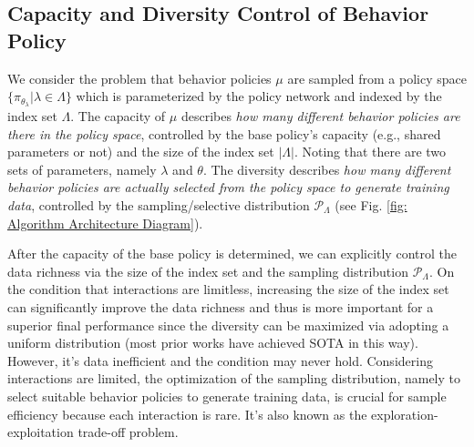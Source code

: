 \documentclass[nohyperref]{article}
\theoremstyle{plain}
\begin{document}
\iffalse
1. 当数据量无限的时候，我们甚至不需要去特意的优化这个选择分布，我们哪怕选择一个random采样（只要保证覆盖全空间就好了），这个时候多样性和复杂性就等价了。因为采样策略族的多样性代表了一群采样策略的差异度。复杂性代表采样策略的复杂度。当数据量无限的时候，我只需要将能够获取到的全部的可行策略构成一个策略族，然后进行采样就可以达到最大的多样性。

2. 但是当我们的数据有限的时候，我们需要专门去优化这个采样分布，因为我们需要从参数化的策略空间中选择那些优质的采样策略来构成一个策略族，此时采样策略的多样性就会受到选择分布的影响。

上面这个逻辑是文章的核心逻辑，最终将整体问题cast成策略空间的

shared or not shared 一般用啥词呀？
\fi


\subsection{Capacity and Diversity  Control of Behavior Policy} 
\label{sec: Explicit  Capacity and Diversity  Control of Behavior Policy}

We consider the problem that behavior policies $\mu$ are sampled from a policy space $\{\pi_{\theta_{\lambda}} | \lambda \in \Lambda\}$ which is parameterized by the policy network and indexed by the index set $\Lambda$.
The capacity of $\mu$ describes \emph{how many different behavior policies are there in the policy space}, controlled by the base policy's capacity (e.g., shared parameters or not) and the size of the index set $|\Lambda|$. Noting that there are two sets of parameters, namely $\lambda$ and $\theta$. The diversity describes \emph{how many different behavior policies are actually selected from the policy space to generate training data}, controlled by the sampling/selective distribution $\mathcal{P}_\Lambda$ (see Fig. \ref{fig: Algorithm Architecture Diagram}). 
 
After the capacity of the base policy is determined, we can explicitly control the data richness via the size of the index set and the sampling distribution $\mathcal{P}_\Lambda$. On the condition that  interactions are limitless, increasing the size  of the index set can significantly improve the data richness and thus is more important for a superior final performance since the diversity can be maximized via adopting a uniform distribution (most prior works have achieved SOTA in this way). However, it's data inefficient and the condition may never hold. Considering interactions are limited, the optimization of the sampling distribution, namely to select suitable behavior policies to generate training data, is crucial for sample efficiency because each interaction is rare. It's also known as the exploration-exploitation trade-off problem.
\end{document}

